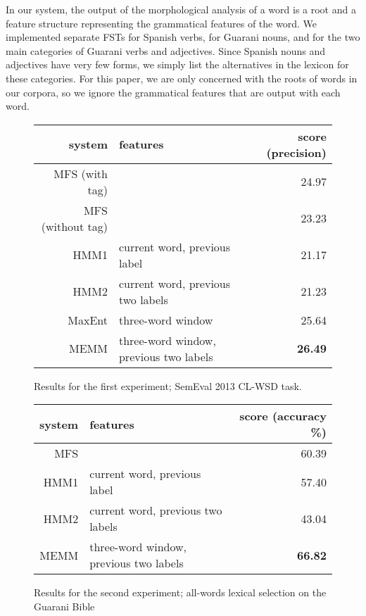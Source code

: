 \documentclass[11pt]{article}
\begin{document}
In our system, the output of the morphological analysis of a word is a root and
a feature structure representing the grammatical features of the word.  We
implemented separate FSTs for Spanish verbs, for Guarani nouns, and for the two
main categories of Guarani verbs and adjectives.  Since Spanish nouns and
adjectives have very few forms, we simply list the alternatives in the lexicon
for these categories.  For this paper, we are only concerned with the roots of
words in our corpora, so we ignore the grammatical features that are output
with each word.

\begin{figure*}[t!]
  \begin{center}
  \begin{tabular}{|r|l|r|}
    \hline
    system & features & score (precision) \\
    \hline
     MFS (with tag) &                                 & 24.97 \\
     MFS (without tag) &                              & 23.23 \\
    \hline
     HMM1    & current word, previous label           & 21.17 \\
     HMM2    & current word, previous two labels      & 21.23 \\
     MaxEnt  & three-word window                      & 25.64 \\
     MEMM    & three-word window, previous two labels & \textbf{26.49} \\
    \hline
  \end{tabular}
  \end{center}
\caption{Results for the first experiment; SemEval 2013 CL-WSD task.}
\label{fig:theresults}
\end{figure*}

\begin{figure*}[t!]
  \begin{center}
  \begin{tabular}{|r|l|r|}
    \hline
    system & features & score (accuracy \%) \\
    \hline
    MFS      &                                        & 60.39  \\
    \hline
     HMM1    & current word, previous label           & 57.40  \\
     HMM2    & current word, previous two labels      & 43.04  \\
     MEMM    & three-word window, previous two labels & \textbf{66.82}  \\
    \hline
  \end{tabular}
  \end{center}
\caption{Results for the second experiment; all-words lexical selection on the
Guarani Bible}
\label{fig:theresults2}
\end{figure*}
\end{document}
